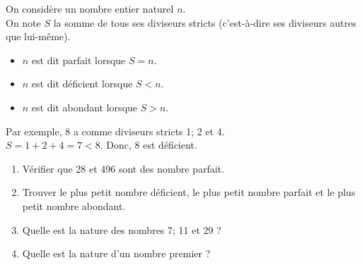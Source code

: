 \begin{exercice*}
   On considère un nombre entier naturel $n$. \\
   On note $S$ la somme de tous ses diviseurs stricts (c'est-à-dire ses diviseurs autres que lui-même). 
   \begin{itemize}
      \item $n$ est dit parfait lorsque $S=n$.
      \item $n$ est dit déficient lorsque $S<n$.
      \item $n$ est dit abondant lorsque $S>n$.
   \end{itemize}
   Par exemple, 8 a comme diviseurs stricts 1; 2 et 4. \\
   $S =1+2+4 =7< 8$. Donc, 8 est déficient.
   \begin{enumerate}
      \item Vérifier que 28 et 496 sont des nombre parfait.
      \item Trouver le plus petit nombre déficient, le plus petit nombre parfait et le plus petit nombre abondant.
      \item Quelle est la nature des nombres 7; 11 et 29 ?
      \item Quelle est la nature d'un nombre premier ?
   \end{enumerate}
\end{exercice*}
